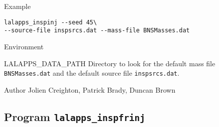 \begin{entry}
\item[Example]
\begin{verbatim}
lalapps_inspinj --seed 45\
--source-file inspsrcs.dat --mass-file BNSMasses.dat
\end{verbatim}

\item[Environment]\leavevmode
\begin{entry}
\item[LALAPPS\_DATA\_PATH] Directory to look for the default mass
file \verb+BNSMasses.dat+ and the default source file \verb+inspsrcs.dat+.
\end{entry}


\item[Author] 
Jolien Creighton, Patrick Brady, Duncan Brown
\end{entry}



\clearpage
\subsection{Program \texttt{lalapps\_inspfrinj}}
\label{program:lalapps-inspfrinj}

